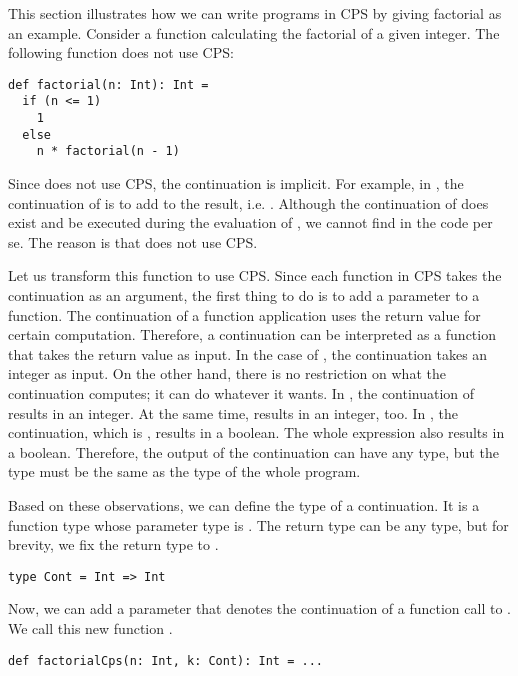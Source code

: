 This section illustrates how we can write programs in CPS by giving factorial as
an example. Consider a function calculating the factorial of a given integer.
The following function does not use CPS:
\begin{verbatim}
def factorial(n: Int): Int =
  if (n <= 1)
    1
  else
    n * factorial(n - 1)
\end{verbatim}
Since  does not use CPS, the continuation is implicit.
For example, in ,
the continuation of  is to add  to the
result, i.e. . Although the continuation of 
does exist and be executed during the evaluation of ,
we cannot find  in the code per se. The reason is that
 does not use CPS.

Let us transform this function to use CPS. Since each function in CPS takes the
continuation as an argument, the first thing to do is to add a parameter to a
function. The continuation of a function application uses the return value for
certain computation.
Therefore, a continuation can be interpreted as a function that takes
the return value as input. In the case of , the continuation
takes an integer as input.
On the other hand, there is no restriction on what the continuation
computes; it can do whatever it wants. In , the
continuation of  results in an integer. At the same time,
 results in an integer, too. In ,
the continuation, which is , results in a boolean. The whole
expression  also results in a boolean.
Therefore, the output of the continuation can have any type,
but the type must be the same as the type of the whole program.

Based on these observations, we can define the type of a continuation.
It is a function type whose parameter type is .
The return type can be any type, but
for brevity, we fix the return type to .

\begin{verbatim}
type Cont = Int => Int
\end{verbatim}

Now, we can add a parameter that denotes the
continuation of a function call to .
We call this new function .

\begin{verbatim}
def factorialCps(n: Int, k: Cont): Int = ...
\end{verbatim}

